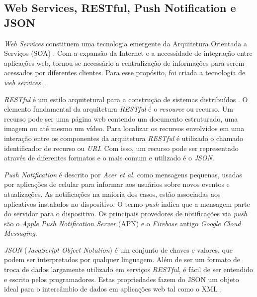 \subsection{Web Services, RESTful, Push Notification e JSON} %
\textit{Web Services} constituem uma tecnologia emergente da Arquitetura Orientada a Serviços (SOA) \cite{perepletchikov}. Com a expansão da Internet e a necessidade de integração entre aplicações web, tornou-se necessário a centralização de informações para serem acessados por diferentes clientes. Para esse propósito, foi criada a tecnologia de \textit{web services} \cite{ibm_research}. 

\textit{RESTful} é um estilo arquitetural para a construção de sistemas distribuídos \cite{fielding}. O elemento fundamental da arquitetura \textit{RESTful} é o \textit{resource} ou recurso. Um recurso pode ser uma página web contendo um documento estruturado, uma imagem ou até mesmo um vídeo. Para localizar os recursos envolvidos em uma interação entre os componentes da arquitetura \textit{RESTful} é utilizado o chamado identificador de recurso ou \textit{URI}. Com isso, um recurso pode ser representado através de diferentes formatos e o mais comum e utilizado é o \textit{JSON}.


\textit{Push Notification} é descrito por \textit{Acer et al.} \cite{Acer:2015:EES:2902314.2902344} como mensagens pequenas, usadas por aplicações de celular para informar aos usuários sobre novos eventos e atualizações. As notificações na maioria dos casos, estão associadas aos aplicativos instalados no dispositivo. O termo \textit{push} indica que a mensagem parte do servidor para o dispositivo. Os principais provedores de notificações via \textit{push} são o \textit{Apple Push Notification Server} (APN) e o \textit{Firebase} antigo \textit{Google Cloud Messaging}.


\textit{JSON} (\textit{JavaScript Object Notation}) é um conjunto de chaves e valores, que podem
ser interpretados por qualquer linguagem. Além de ser um formato de troca de dados largamente utilizado em serviços \textit{RESTful}, é fácil de ser entendido e escrito pelos programadores. Estas propriedades fazem do JSON um objeto ideal para o intercâmbio de dados em aplicações web tal como o XML \cite{jun_y_zhishu}.